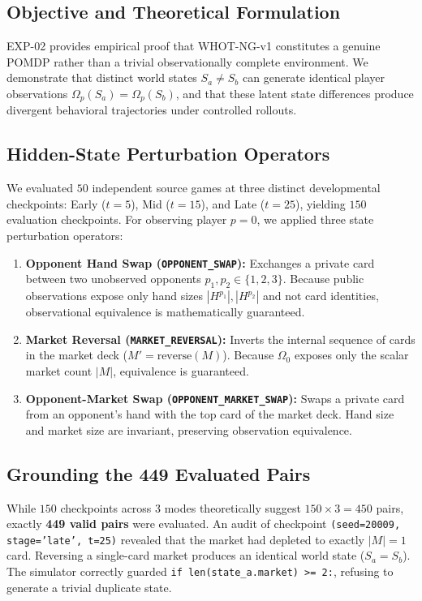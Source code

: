 \documentclass[11pt]{article}
\begin{document}
\subsection{Objective and Theoretical Formulation}
EXP-02 provides empirical proof that WHOT-NG-v1 constitutes a genuine POMDP rather than a trivial observationally complete environment. We demonstrate that distinct world states $S_a \neq S_b$ can generate identical player observations $\Omega_p(S_a) = \Omega_p(S_b)$, and that these latent state differences produce divergent behavioral trajectories under controlled rollouts.

\subsection{Hidden-State Perturbation Operators}
We evaluated $50$ independent source games at three distinct developmental checkpoints: Early ($t=5$), Mid ($t=15$), and Late ($t=25$), yielding $150$ evaluation checkpoints. For observing player $p=0$, we applied three state perturbation operators:
\begin{enumerate}
  \item \textbf{Opponent Hand Swap (\texttt{OPPONENT\_SWAP}):} Exchanges a private card between two unobserved opponents $p_1, p_2 \in \{1, 2, 3\}$. Because public observations expose only hand sizes $|H^{p_1}|, |H^{p_2}|$ and not card identities, observational equivalence is mathematically guaranteed.
  \item \textbf{Market Reversal (\texttt{MARKET\_REVERSAL}):} Inverts the internal sequence of cards in the market deck ($M' = \text{reverse}(M)$). Because $\Omega_0$ exposes only the scalar market count $|M|$, equivalence is guaranteed.
  \item \textbf{Opponent-Market Swap (\texttt{OPPONENT\_MARKET\_SWAP}):} Swaps a private card from an opponent's hand with the top card of the market deck. Hand size and market size are invariant, preserving observation equivalence.
\end{enumerate}

\subsection{Grounding the 449 Evaluated Pairs}
While $150$ checkpoints across 3 modes theoretically suggest $150 \times 3 = 450$ pairs, exactly \textbf{449 valid pairs} were evaluated. An audit of checkpoint \texttt{(seed=20009, stage='late', t=25)} revealed that the market had depleted to exactly $|M| = 1$ card. Reversing a single-card market produces an identical world state ($S_a = S_b$). The simulator correctly guarded \texttt{if len(state\_a.market) >= 2:}, refusing to generate a trivial duplicate state.
\end{document}
